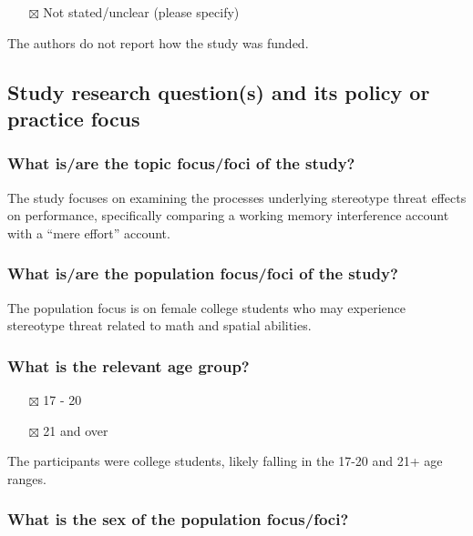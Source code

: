 \documentclass[
  doc, a4paper]{apa7}
\providecommand{\tightlist}{%
  \setlength{\itemsep}{0pt}\setlength{\parskip}{0pt}}
\begin{document}
\begin{itemize}
\tightlist
\item[$\boxtimes$]
  Not stated/unclear (please specify)
\end{itemize}

The authors do not report how the study was funded.

\subsection{Study research question(s) and its policy or practice focus}\label{study-research-questions-and-its-policy-or-practice-focus}

\subsubsection{What is/are the topic focus/foci of the study?}\label{what-isare-the-topic-focusfoci-of-the-study}

The study focuses on examining the processes underlying stereotype threat effects on performance, specifically comparing a working memory interference account with a ``mere effort'' account.

\subsubsection{What is/are the population focus/foci of the study?}\label{what-isare-the-population-focusfoci-of-the-study}

The population focus is on female college students who may experience stereotype threat related to math and spatial abilities.

\subsubsection{What is the relevant age group?}\label{what-is-the-relevant-age-group}

\begin{itemize}
\tightlist
\item[$\boxtimes$]
  17 - 20\\
\item[$\boxtimes$]
  21 and over
\end{itemize}

The participants were college students, likely falling in the 17-20 and 21+ age ranges.

\subsubsection{What is the sex of the population focus/foci?}\label{what-is-the-sex-of-the-population-focusfoci}
\end{document}
